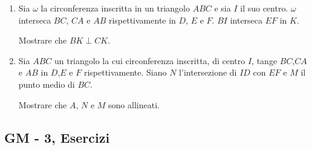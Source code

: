 \begin{enumerate}
    \item Sia $\omega$ la circonferenza inscritta in un triangolo $ABC$ e sia $I$ il suo centro. $\omega$ interseca $BC$, $CA$ e $AB$ rispettivamente in $D$, $E$ e $F$. $BI$ interseca $EF$ in $K$.
    
    Mostrare che $BK\perp CK$. 
    \item Sia $ABC$ un triangolo la cui circonferenza inscritta, di centro $I$, tange $BC$,$CA$ e $AB$ in $D$,$E$ e $F$  rispettivamente. Siano $N$ l'intersezione di $ID$ con $EF$ e $M$ il punto medio di $BC$.
    
    Mostrare che $A$, $N$ e $M$ sono allineati.
\end{enumerate}
\clearpage
\subsection{GM - 3, Esercizi}
